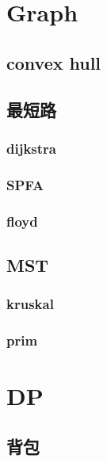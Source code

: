 \section{Graph}

\subsection{convex hull}


\subsection{最短路}
\subsubsection{dijkstra}


\subsubsection{SPFA}


\subsubsection{floyd}


\subsection{MST}
\subsubsection{kruskal}


\subsubsection{prim}


\section{DP}

\subsection{背包}

